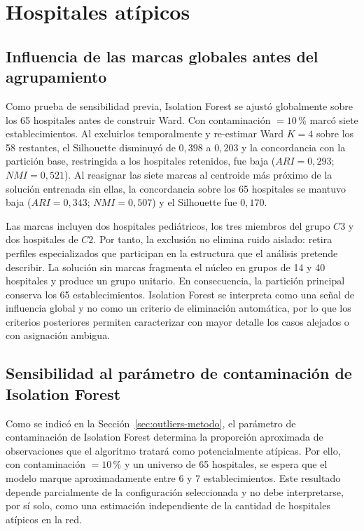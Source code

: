 \section{Hospitales atípicos}

\label{sec:res-outliers}

\subsection{Influencia de las marcas globales antes del agrupamiento}
\label{sec:res-outliers-preclustering}

Como prueba de sensibilidad previa, Isolation Forest se ajustó globalmente
sobre los 65 hospitales antes de construir Ward. Con contaminación $=10\,\%$
marcó siete establecimientos. Al excluirlos temporalmente y re-estimar Ward
$K=4$ sobre los 58 restantes, el Silhouette disminuyó de $0{,}398$ a $0{,}203$
y la concordancia con la partición base, restringida a los hospitales retenidos,
fue baja ($ARI=0{,}293$; $NMI=0{,}521$). Al reasignar las siete marcas al
centroide más próximo de la solución entrenada sin ellas, la concordancia sobre
los 65 hospitales se mantuvo baja ($ARI=0{,}343$; $NMI=0{,}507$) y el
Silhouette fue $0{,}170$.

Las marcas incluyen dos hospitales pediátricos, los tres miembros del grupo
$C3$ y dos hospitales de $C2$. Por tanto, la exclusión no elimina ruido aislado:
retira perfiles especializados que participan en la estructura que el análisis
pretende describir. La solución sin marcas fragmenta el núcleo en grupos de 14
y 40 hospitales y produce un grupo unitario. En consecuencia, la partición
principal conserva los 65 establecimientos. Isolation Forest se interpreta como
una señal de influencia global y no como un criterio de eliminación automática, por lo que
los criterios posteriores permiten caracterizar con mayor detalle los casos
alejados o con asignación ambigua.

\subsection{Sensibilidad al parámetro de contaminación de Isolation Forest}

\label{sec:res-outliers-sensibilidad}

Como se indicó en la Sección~\ref{sec:outliers-metodo}, el parámetro de contaminación de Isolation Forest determina la proporción aproximada de observaciones que el algoritmo tratará como potencialmente atípicas. Por ello, con contaminación $=10\,\%$ y un universo de 65 hospitales, se espera que el modelo marque aproximadamente entre 6 y 7 establecimientos. Este resultado depende parcialmente de la configuración seleccionada y no debe interpretarse, por sí solo, como una estimación independiente de la cantidad de hospitales atípicos en la red.

